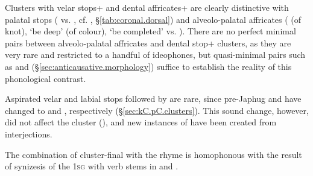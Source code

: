 Clusters with velar stops+  and dental affricates+ are clearly distinctive with palatal stops ( vs. , cf. , §\ref{tab:coronal.dorsal}) and alveolo-palatal affricates ( (of knot), `be deep' (of colour), `be completed' vs. ). There are no perfect minimal pairs between alveolo-palatal affricates and dental stop+ clusters, as they are very rare and restricted to a handful of ideophones, but quasi-minimal pairs such as  and (§\ref{sec:anticausative.morphology}) suffice to establish the reality of this phonological contrast.

Aspirated velar and labial stops followed by  are rare, since pre-Japhug  and  have changed to  and , respectively (§\ref{sec:kC.pC.clusters}). This sound change, however, did not affect the cluster  (), and new instances of  have been created from interjections.

The combination of cluster-final  with the rhyme  is homophonous with the result of synizesis of the \textsc{1sg}  with verb stems in  and .

